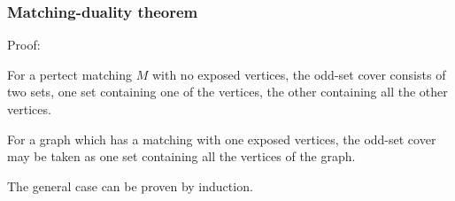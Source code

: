 \documentclass[hyperref={pdfpagelabels=false}]{beamer}
\begin{document}
\frame
{
	\frametitle{Matching-duality theorem}
	
	\begin{itemize}
	{
		\item Proof:
		
		\bigskip
		
		For a pertect matching $M$ with no exposed vertices, the odd-set cover consists of two sets, one set  containing one of the vertices, the other containing all the other vertices.
		
		\bigskip
		
		For a graph which has a matching with one exposed vertices, the odd-set cover may be taken as one set containing all the vertices of the graph.
		
		\bigskip
		
		The general case can be proven by induction.
		
	}
	\end{itemize}
}

%	
%		
%		
\end{document}
